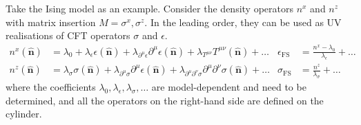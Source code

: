 \documentclass{timesjhep}
\begin{document}
Take the Ising model as an example. Consider the density operators $n^x$ and $n^z$ with matrix insertion $M=\sigma^x,\sigma^z$. In the leading order, they can be used as UV realisations of CFT operators $\sigma$ and $\epsilon$.
\begin{align}
    n^x(\hat{\mathbf{n}})&=\lambda_0+\lambda_\epsilon\epsilon(\hat{\mathbf{n}})+\lambda_{\partial^\mu\epsilon}\partial^\mu\epsilon(\hat{\mathbf{n}})+\lambda_{T^{\mu\nu}}T^{\mu\nu}(\hat{\mathbf{n}})+\dots&\epsilon_\mathrm{FS}&=\frac{n^x-\lambda_0}{\lambda_\epsilon}+\dots\nonumber\\
    n^z(\hat{\mathbf{n}})&=\lambda_\sigma\sigma(\hat{\mathbf{n}})+\lambda_{\partial^\mu\sigma}\partial^\mu\epsilon(\hat{\mathbf{n}})+\lambda_{\partial^\mu\partial^\nu\sigma}\partial^\mu\partial^\nu\sigma(\hat{\mathbf{n}})+\dots&\sigma_\mathrm{FS}&=\frac{n^z}{\lambda_\sigma}+\dots 
\end{align} 
where the coefficients $\lambda_0,\lambda_\epsilon,\lambda_\sigma,\dots$ are model-dependent and need to be determined, and all the operators on the right-hand side are defined on the cylinder. 
\end{document}

